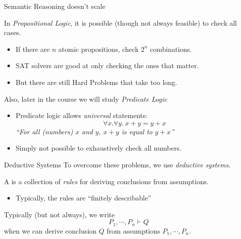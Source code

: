 \documentclass[xetex,aspectratio=169,14pt,hyperref={pdfpagelabels=true,pdflang={en-GB}}]{beamer}
\begin{document}
\begin{frame}
  {Semantic Reasoning doesn't scale}

  In \emph{Propositional Logic}, it is possible (though not always
  feasible) to check all cases.
  \begin{itemize}
  \item If there are $n$ atomic propositions, check $2^n$ combinations.
  \item SAT solvers are good at only checking the ones that matter.
  \item But there are still Hard Problems that take too long.
  \end{itemize}

  \pause
  \bigskip

  Also, later in the course we will study \emph{Predicate Logic}
  \begin{itemize}
  \item Predicate logic allows \emph{universal} statements:
    \begin{displaymath}
      \forall x.\forall y.~x+y = y+x
    \end{displaymath}
    \emph{``For all (numbers) $x$ and $y$, $x+y$ is equal to $y+x$''}
  \item Simply not possible to exhaustively check all numbers.
  \end{itemize}
\end{frame}

\begin{frame}
  {Deductive Systems}
  To overcome these problems, we use \emph{deductive systems}.

  \bigskip

  A  is a collection of \emph{rules} for
  deriving conclusions from assumptions.
  \begin{itemize}
  \item Typically, the rules are ``finitely describable'' \\
  \end{itemize}

  \bigskip

  Typically (but not always), we write
  \begin{displaymath}
    P_1, \cdots, P_n \vdash Q
  \end{displaymath}
  when we can derive conclusion $Q$ from assumptions $P_1, \cdots, P_n$.


\end{frame}
\end{document}
